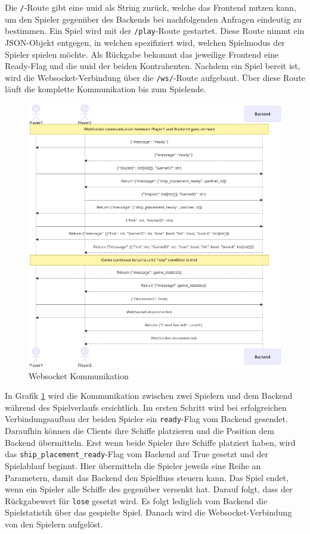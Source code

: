 \documentclass[a4paper, 10pt, conference]{IEEEtran}
\begin{document}
Die \texttt{/}-Route gibt eine \ac{uuid} als String zurück, welche das Frontend nutzen kann, um den Spieler gegenüber des Backends bei nachfolgenden Anfragen eindeutig zu bestimmen. Ein Spiel wird mit der \texttt{/play}-Route gestartet. Diese Route nimmt ein JSON-Objekt entgegen, in welchen spezifiziert wird, welchen Spielmodus der Spieler spielen möchte. Als Rückgabe bekommt das jeweilige Frontend eine Ready-Flag und die \ac{uuid} der beiden Kontrahenten. Nachdem ein Spiel bereit ist, wird die Websocket-Verbindung über die \texttt{/ws/}-Route aufgebaut. Über diese Route läuft die komplette Kommunikation bis zum Spielende.

\begin{figure}[thp]
    \centering
    \includegraphics[width=\linewidth]{websocket_comm}
    \caption{Websocket Kommunikation}
    \label{fig:websocket_comm}
\end{figure}

In Grafik \ref{fig:websocket_comm} wird die Kommunikation zwischen zwei Spielern und dem Backend während des Spielverlaufs ersichtlich. Im ersten Schritt wird bei erfolgreichen Verbindungsaufbau der beiden Spieler ein \texttt{ready}-Flag vom Backend gesendet. Daraufhin können die Clients ihre Schiffe platzieren und die Position dem Backend übermitteln. Erst wenn beide Spieler ihre Schiffe platziert haben, wird das \texttt{ship\_placement\_ready}-Flag vom Backend auf True gesetzt und der Spielablauf beginnt. Hier übermitteln die Spieler jeweils eine Reihe an Parametern, damit das Backend den Spielfluss steuern kann. Das Spiel endet, wenn ein Spieler alle Schiffe des gegenüber versenkt hat. Darauf folgt, dass der Rückgabewert für \texttt{lose} gesetzt wird. Es folgt lediglich vom Backend die Spielstatistik über das gespielte Spiel. Danach wird die Websocket-Verbindung von den Spielern aufgelöst.
\end{document}
